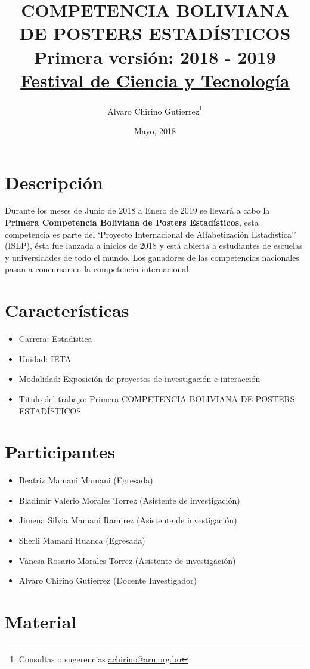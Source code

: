 \documentclass{article}
\title{\textbf{COMPETENCIA BOLIVIANA DE POSTERS ESTADÍSTICOS}\\ Primera versión: 2018 - 2019 \\ \underline{\underline{Festival de Ciencia y Tecnología}} }
\author{Alvaro Chirino Gutierrez\thanks{Consultas o sugerencias \href{mailto:achirino@aru.org.bo}{achirino@aru.org.bo}}}
\date{Mayo, 2018}
\begin{document}
\maketitle
\section{Descripción}
Durante los meses de Junio de 2018 a Enero de 2019 se llevará a cabo la \textbf{Primera Competencia Boliviana de Posters Estadísticos}, esta competencia es parte del `Proyecto Internacional de Alfabetización Estadística'' (ISLP), ésta fue lanzada a inicios de 2018 y está abierta a estudiantes de escuelas y universidades de todo el mundo. Los ganadores de las competencias nacionales pasan a concursar en la competencia internacional.

\section{Características}
\begin{itemize}
\item Carrera: Estadística
\item Unidad: IETA
\item Modalidad: Exposición de proyectos de investigación e interacción
\item Titulo del trabajo: Primera COMPETENCIA BOLIVIANA DE POSTERS ESTADÍSTICOS
\end{itemize}

\section{Participantes}

\begin{itemize}
\item Beatriz Mamani Mamani (Egresada)
\item Bladimir Valerio Morales Torrez (Asistente de investigación)
\item Jimena Silvia Mamani Ramirez (Asistente de investigación)
\item Sherli Mamani Huanca (Egresada)
\item Vanesa Rosario Morales Torrez (Asistente de investigación)
\item Alvaro Chirino Gutierrez (Docente Investigador)
\end{itemize}
\section{Material}
\end{document}
